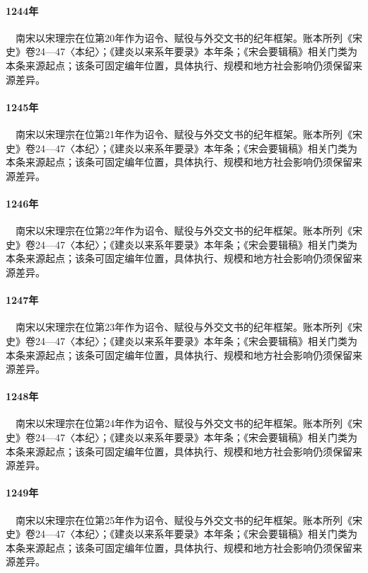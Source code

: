 \paragraph{1244年}　南宋以宋理宗在位第20年作为诏令、赋役与外交文书的纪年框架。账本所列《宋史》卷24—47〈本纪〉；《建炎以来系年要录》本年条；《宋会要辑稿》相关门类为本条来源起点；该条可固定编年位置，具体执行、规模和地方社会影响仍须保留来源差异。

\paragraph{1245年}　南宋以宋理宗在位第21年作为诏令、赋役与外交文书的纪年框架。账本所列《宋史》卷24—47〈本纪〉；《建炎以来系年要录》本年条；《宋会要辑稿》相关门类为本条来源起点；该条可固定编年位置，具体执行、规模和地方社会影响仍须保留来源差异。

\paragraph{1246年}　南宋以宋理宗在位第22年作为诏令、赋役与外交文书的纪年框架。账本所列《宋史》卷24—47〈本纪〉；《建炎以来系年要录》本年条；《宋会要辑稿》相关门类为本条来源起点；该条可固定编年位置，具体执行、规模和地方社会影响仍须保留来源差异。

\paragraph{1247年}　南宋以宋理宗在位第23年作为诏令、赋役与外交文书的纪年框架。账本所列《宋史》卷24—47〈本纪〉；《建炎以来系年要录》本年条；《宋会要辑稿》相关门类为本条来源起点；该条可固定编年位置，具体执行、规模和地方社会影响仍须保留来源差异。

\paragraph{1248年}　南宋以宋理宗在位第24年作为诏令、赋役与外交文书的纪年框架。账本所列《宋史》卷24—47〈本纪〉；《建炎以来系年要录》本年条；《宋会要辑稿》相关门类为本条来源起点；该条可固定编年位置，具体执行、规模和地方社会影响仍须保留来源差异。

\paragraph{1249年}　南宋以宋理宗在位第25年作为诏令、赋役与外交文书的纪年框架。账本所列《宋史》卷24—47〈本纪〉；《建炎以来系年要录》本年条；《宋会要辑稿》相关门类为本条来源起点；该条可固定编年位置，具体执行、规模和地方社会影响仍须保留来源差异。

